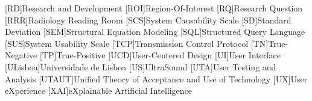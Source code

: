 \begin{acronym}[H.264/SVC]
[RD]{Research and Development}
[ROI]{Region-Of-Interest}
[RQ]{Research Question}
[RRR]{Radiology Reading Room}
[SCS]{System Causability Scale}
[SD]{Standard Deviation}
[SEM]{Structural Equation Modeling}
[SQL]{Structured Query Language}
[SUS]{System Usability Scale}
[TCP]{Transmission Control Protocol}
[TN]{True-Negative}
[TP]{True-Positive}
[UCD]{User-Centered Design}
[UI]{User Interface}
[ULisboa]{Universidade de Lisboa}
[US]{UltraSound}
[UTA]{User Testing and Analysis}
[UTAUT]{Unified Theory of Acceptance and Use of Technology}
[UX]{User eXperience}
[XAI]{eXplainable Artificial Intelligence}
\end{acronym}